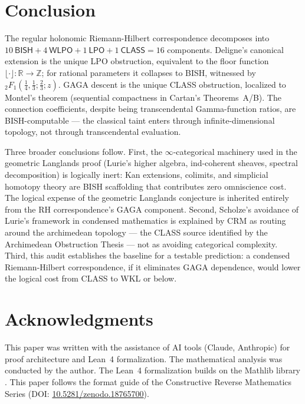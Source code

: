 \documentclass[11pt,a4paper]{article}
\theoremstyle{plain}
\theoremstyle{definition}
\newcommand{\BISH}{\textsf{BISH}}
\newcommand{\WKL}{\textsf{WKL}}
\newcommand{\WLPO}{\textsf{WLPO}}
\newcommand{\LPO}{\textsf{LPO}}
\newcommand{\CLASS}{\textsf{CLASS}}
\newcommand{\Z}{\mathbb{Z}}
\newcommand{\R}{\mathbb{R}}
\begin{document}
\section{Conclusion}

The regular holonomic Riemann-Hilbert correspondence decomposes into $10\ \BISH + 4\ \WLPO + 1\ \LPO + 1\ \CLASS = 16$ components.
Deligne's canonical extension is the unique \LPO{} obstruction, equivalent to the floor function $\lfloor \cdot \rfloor : \R \to \Z$; for rational parameters it collapses to \BISH, witnessed by ${}_2F_1(\tfrac{1}{4}, \tfrac{1}{3}; \tfrac{2}{3}; z)$.
GAGA descent is the unique \CLASS{} obstruction, localized to Montel's theorem (sequential compactness in Cartan's Theorems~A/B).
The connection coefficients, despite being transcendental Gamma-function ratios, are \BISH-computable --- the classical taint enters through infinite-dimensional topology, not through transcendental evaluation.

Three broader conclusions follow.
First, the $\infty$-categorical machinery used in the geometric Langlands proof (Lurie's higher algebra, ind-coherent sheaves, spectral decomposition) is logically inert: Kan extensions, colimits, and simplicial homotopy theory are \BISH{} scaffolding that contributes zero omniscience cost.
The logical expense of the geometric Langlands conjecture is inherited entirely from the RH correspondence's GAGA component.
Second, Scholze's avoidance of Lurie's framework in condensed mathematics is explained by CRM as routing around the archimedean topology --- the \CLASS{} source identified by the Archimedean Obstruction Thesis --- not as avoiding categorical complexity.
Third, this audit establishes the baseline for a testable prediction: a condensed Riemann-Hilbert correspondence, if it eliminates GAGA dependence, would lower the logical cost from \CLASS{} to \WKL{} or below.

\section*{Acknowledgments}

This paper was written with the assistance of AI tools (Claude, Anthropic) for proof architecture and Lean~4 formalization.
The mathematical analysis was conducted by the author.
The Lean~4 formalization builds on the Mathlib library \cite{Mathlib}.
This paper follows the format guide of the Constructive Reverse Mathematics Series (DOI: \href{https://doi.org/10.5281/zenodo.18765700}{10.5281/zenodo.18765700}).
\end{document}
